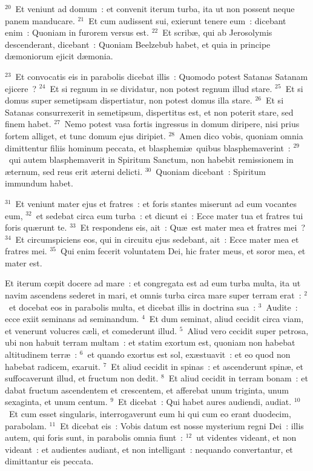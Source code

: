 ${}^{20}$~Et veniunt ad domum~: et convenit iterum turba, ita ut non possent neque panem manducare.
${}^{21}$~Et cum audissent sui, exierunt tenere eum~: dicebant enim~: Quoniam in furorem versus est.
${}^{22}$~Et scrib\ae , qui ab Jerosolymis descenderant, dicebant~: Quoniam Beelzebub habet, et quia in principe d\ae moniorum ejicit d\ae monia.


${}^{23}$~Et convocatis eis in parabolis dicebat illis~: Quomodo potest Satanas Satanam ejicere~?
${}^{24}$~Et si regnum in se dividatur, non potest regnum illud stare.
${}^{25}$~Et si domus super semetipsam dispertiatur, non potest domus illa stare.
${}^{26}$~Et si Satanas consurrexerit in semetipsum, dispertitus est, et non poterit stare, sed finem habet.
${}^{27}$~Nemo potest vasa fortis ingressus in domum diripere, nisi prius fortem alliget, et tunc domum ejus diripiet.
${}^{28}$~Amen dico vobis, quoniam omnia dimittentur filiis hominum peccata, et blasphemi\ae\ quibus blasphemaverint~:
${}^{29}$~qui autem blasphemaverit in Spiritum Sanctum, non habebit remissionem in \ae ternum, sed reus erit \ae terni delicti.
${}^{30}$~Quoniam dicebant~: Spiritum immundum habet.


${}^{31}$~Et veniunt mater ejus et fratres~: et foris stantes miserunt ad eum vocantes eum,
${}^{32}$~et sedebat circa eum turba~: et dicunt ei~: Ecce mater tua et fratres tui foris qu\ae runt te.
${}^{33}$~Et respondens eis, ait~: Qu\ae\ est mater mea et fratres mei~?
${}^{34}$~Et circumspiciens eos, qui in circuitu ejus sedebant, ait~: Ecce mater mea et fratres mei.
${}^{35}$~Qui enim fecerit voluntatem Dei, hic frater meus, et soror mea, et mater est.

\lettrine[lines=3,image=true,loversize=0.05,lraise=-0.03]{E}{}t iterum cœpit docere ad mare~: et congregata est ad eum turba multa, ita ut navim ascendens sederet in mari, et omnis turba circa mare super terram erat~:
${}^{2}$~et docebat eos in parabolis multa, et dicebat illis in doctrina sua~:
${}^{3}$~Audite~: ecce exiit seminans ad seminandum.
${}^{4}$~Et dum seminat, aliud cecidit circa viam, et venerunt volucres c\ae li, et comederunt illud.
${}^{5}$~Aliud vero cecidit super petrosa, ubi non habuit terram multam~: et statim exortum est, quoniam non habebat altitudinem terr\ae~:
${}^{6}$~et quando exortus est sol, ex\ae stuavit~: et eo quod non habebat radicem, exaruit.
${}^{7}$~Et aliud cecidit in spinas~: et ascenderunt spin\ae , et suffocaverunt illud, et fructum non dedit.
${}^{8}$~Et aliud cecidit in terram bonam~: et dabat fructum ascendentem et crescentem, et afferebat unum triginta, unum sexaginta, et unum centum.
${}^{9}$~Et dicebat~: Qui habet aures audiendi, audiat.
${}^{10}$~Et cum esset singularis, interrogaverunt eum hi qui cum eo erant duodecim, parabolam.
${}^{11}$~Et dicebat eis~: Vobis datum est nosse mysterium regni Dei~: illis autem, qui foris sunt, in parabolis omnia fiunt~:
${}^{12}$~ut videntes videant, et non videant~: et audientes audiant, et non intelligant~: nequando convertantur, et dimittantur eis peccata.


